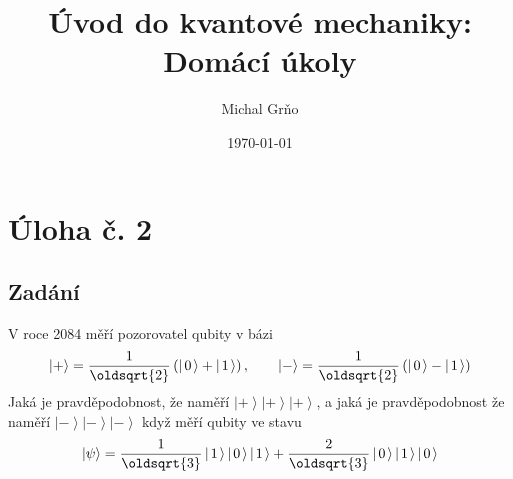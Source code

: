 \documentclass[10pt,a4paper]{article}
\newcommand*{\mask}[2]{%
    \mathord{\makebox[\widthof{\(#1\)}]{\(#2\)}}%
}
\newcommand{\ket}[1]{\left| #1 \right>}
\def\kzero{\ket{\mask{+}{0}}}
\def\kone{\ket{\mask{+}{1}}}
\def\kplus{\ket{+}}
\def\kminus{\ket{-}}
\begin{document}
\title{Úvod do kvantové mechaniky: Domácí úkoly}
\author{Michal Grňo}
\date{\today}

\maketitle

\section{Úloha č. 2}

\subsection{Zadání}
V roce 2084 měří pozorovatel qubity v bázi
\begin{equation*}
    \kplus = \frac{1}{\oldsqrt{2}} \left(\kzero + \kone\right),
    \hspace{2em}
    \kminus = \frac{1}{\oldsqrt{2}} \left(\kzero - \kone\right)
\end{equation*}
Jaká je pravděpodobnost, že naměří $\kplus\kplus\kplus$, a jaká je pravděpodobnost že naměří $\kminus\kminus\kminus$ když měří qubity ve stavu
\begin{equation*}
    \ket{\psi} = \frac{1}{\oldsqrt{3}} \kone\kzero\kone + \frac{2}{\oldsqrt{3}} \kzero\kone\kzero
\end{equation*}
\end{document}
